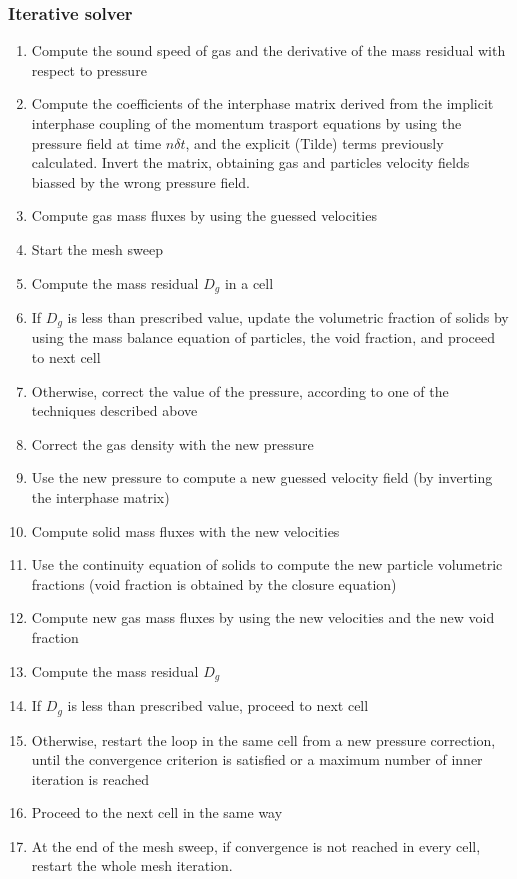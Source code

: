 \subsubsection{Iterative solver}
\begin{enumerate}
\item Compute the sound speed of gas and the derivative of the mass residual with respect to pressure
\item Compute the coefficients of the interphase matrix derived from the implicit interphase coupling of the 
momentum trasport equations by using the pressure field at time $n\delta t$, and the explicit (Tilde) terms 
previously calculated. Invert the matrix, obtaining gas and particles velocity fields biassed by the wrong
pressure field.
\item Compute gas mass fluxes by using the guessed velocities
\item Start the mesh sweep
\item Compute the mass residual $D_g$ in a cell
\item If $D_g$ is less than  prescribed value, update the volumetric fraction of solids by using the mass balance
equation of particles, the void fraction, and proceed to next cell
\item Otherwise, correct the value of the pressure, according to one of the techniques described above
\item Correct the gas density with the new pressure
\item Use the new pressure to compute a new guessed velocity field (by inverting the interphase matrix)
\item Compute solid mass fluxes with the new velocities
\item Use the continuity equation of solids to compute the new particle volumetric fractions (void fraction 
is obtained by the closure equation)
\item Compute new gas mass fluxes by using the new velocities and the new void fraction
\item Compute the mass residual $D_g$
\item If $D_g$ is less than  prescribed value, proceed to next cell
\item Otherwise, restart the loop in the same cell from a new pressure correction, until the convergence criterion is
satisfied or a maximum number of inner iteration is reached
\item Proceed to the next cell in the same way
\item At the end of the mesh sweep, if convergence is not reached in every cell, restart the whole mesh iteration.
\end{enumerate}
